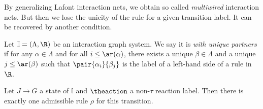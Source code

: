 \begin{example}
  By generalizing Lafont interaction nets, we obtain so called \emph{multiwired} interaction nets. 
  But then we lose the unicity of the rule for a given transition label.
  It can be recovered by another condition.


  \begin{definition}
    Let $\mathbb I = (\Lambda,\R)$ be an interaction graph system.
    We say it is \emph{with unique partners} if for any $\alpha \in \Lambda$ and for all $i \leq \ar(\alpha)$, 
    there exists a unique $\beta \in \Lambda$ and a unique $j \leq \ar(\beta)$ such that $\pair{\alpha_i}{\beta_j}$ is the label of a left-hand side of a rule in $\R$.
  \end{definition}


  \begin{lemma}
    Let $J \rightarrow G$ a state of\/ $\mathbb I$ and $\theaction$ a non-$\tau$ reaction label.
    Then there is exactly one  admissible rule $\rho$ for this transition.
    \label{lem:therule2}
  \end{lemma}
\end{example}



